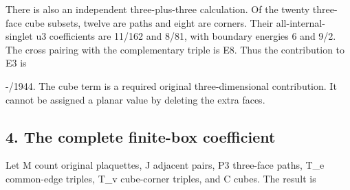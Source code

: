 \documentclass[11pt,a4paper]{article}
\renewcommand{\[}{\begingroup\small\originaldisplaystart}
\renewcommand{\]}{\originaldisplayend\endgroup}
\begin{document}
There is also an independent three-plus-three calculation. Of the twenty
three-face cube subsets, twelve are paths and eight are corners. Their
all-internal-singlet u3 coefficients are 11/162 and 8/81, with boundary
energies 6 and 9/2. The cross pairing with the complementary triple is
E8. Thus the contribution to E3 is

\[
 -/1944.
\] The cube term is a required original three-dimensional contribution.
It cannot be assigned a planar value by deleting the extra faces.

\subsection{4. The complete finite-box
coefficient}\label{the-complete-finite-box-coefficient}

Let M count original plaquettes, J adjacent pairs, P3 three-face paths,
T\_e common-edge triples, T\_v cube-corner triples, and C cubes. The
result is
\end{document}
